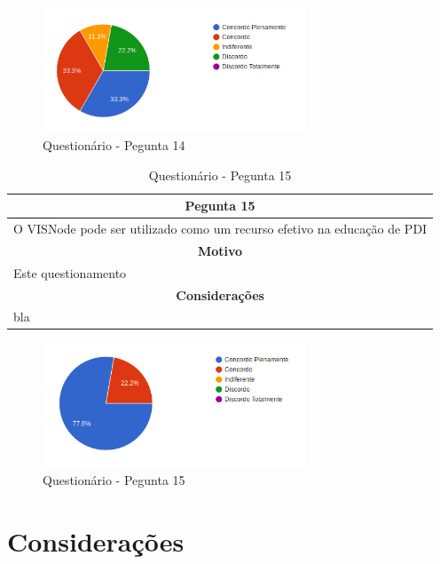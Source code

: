 \documentclass[
	12pt,				%
	oneside,			%
	a4paper,			%
	english,			%
	french,				%
	spanish,			%
	brazil,				%
	]{abntex2}
\begin{document}
\begin{figure}[H]
\centering
\caption{Questionário - Pegunta 14}
\includegraphics[width=0.7\textwidth]{imagens/v1/p14.png}
\sourceAuthor
\end{figure}

\begin{table}[H]
\centering
\caption{Questionário - Pegunta 15} 
\def\arraystretch{1.5}
\begin{tabular}{l}
\hline
\multicolumn{1}{c}{\textbf{Pegunta 15}}              \\ \hline
O VISNode pode ser utilizado como um recurso efetivo na educação de PDI \\ \hline
\multicolumn{1}{c}{\textbf{Motivo}}                 \\ \hline
Este questionamento                                   \\ \hline
\multicolumn{1}{c}{\textbf{Considerações}}          \\ \hline
bla                                                   \\ \hline
\end{tabular}
\sourceAuthor
\end{table}

\begin{figure}[H]
\centering
\caption{Questionário - Pegunta 15}
\includegraphics[width=0.7\textwidth]{imagens/v1/p15.png}
\sourceAuthor
\end{figure}

\section{Considerações}
\end{document}
